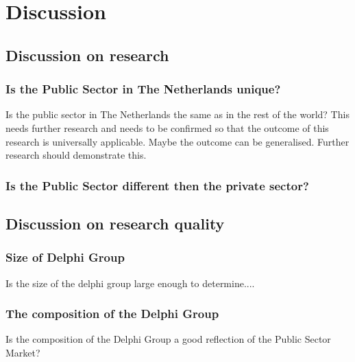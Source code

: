 \chapter{Discussion}
\label{ch:discussion}


\section{Discussion on research}
\label{sec:discussiononresearch}


\subsection{Is the Public Sector in The Netherlands unique?}
\label{sub:discussionpublicsector}
Is the public sector in The Netherlands the same as in the rest of the world? This needs further research and needs to be confirmed so that the outcome of this research is universally applicable. Maybe the outcome can be generalised. Further research should demonstrate this.

\subsection{Is the Public Sector different then the private sector?}
\label{sub:discussionpublicvsprivate}
\lipsum[1]


\section{Discussion on research quality}
\label{sec:discusssionresearchquality}
\subsection{Size of Delphi Group}
\label{sub:discussionsizeofdelphi}
Is the size of the delphi group large enough to determine....
\subsection{The composition of the Delphi Group}
\label{sub:compositionofdelphi}
Is the composition of the Delphi Group a good reflection of the Public Sector Market?